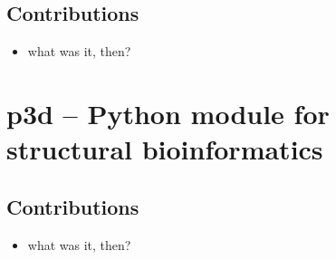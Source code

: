 \label{paper:gpf}

\subsection*{Contributions}

\begin{itemize}
\item what was it, then?
\end{itemize}


% 
% 
% 

\cleardoublepage
\section{p3d -- Python module for structural bioinformatics}

\subsection*{Contributions}

\begin{itemize}
\item what was it, then?
\end{itemize}

